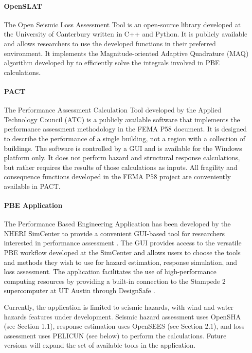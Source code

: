 \paragraph{OpenSLAT} The Open Seismic Loss Assessment Tool is an open-source library developed at the University of Canterbury written in C++ and Python. It is publicly available and allows researchers to use the developed functions in their preferred environment. It implements the Magnitude-oriented Adaptive Quadrature (MAQ) algorithm developed by \cite{bradley2010efficient} to efficiently solve the integrals involved in PBE calculations.

\paragraph{PACT} The Performance Assessment Calculation Tool developed by the Applied Technology Council (ATC) is a publicly available software that implements the performance assessment methodology in the FEMA P58 document. It is designed to describe the performance of a single building, not a region with a collection of buildings. The software is controlled by a GUI and is available for the Windows platform only. It does not perform hazard and structural response calculations, but rather requires the results of those calculations as inputs. All fragility and consequence functions developed in the FEMA P58 project are conveniently available in PACT.

\paragraph{PBE Application} The Performance Based Engineering Application has been developed by the NHERI SimCenter to provide a convenient GUI-based tool for researchers interested in performance assessment \citep{mckenna2018performance}. The GUI provides access to the versatile PBE workflow developed at the SimCenter and allows users to choose the tools and methods they wish to use for hazard estimation, response simulation, and loss assessment. The application facilitates the use of high-performance computing resources by providing a built-in connection to the Stampede 2 supercomputer at UT Austin through DesignSafe \citep{rathje2017designsafe}.

Currently, the application is limited to seismic hazards, with wind and water hazards features under development. Seismic hazard assessment uses OpenSHA (see Section 1.1), response estimation uses OpenSEES (see Section 2.1), and loss assessment uses PELICUN (see below) to perform the calculations. Future versions will expand the set of available tools in the application.

